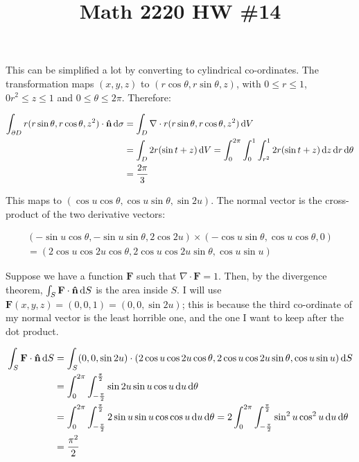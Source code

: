 

\title{Math 2220 HW \#14}
\author{\name}
\maketitle


This can be simplified a lot by converting to cylindrical co-ordinates. The transformation maps $(x, y, z)$ to $(r \cos\theta, r \sin\theta, z)$, with $0 \leq r \leq 1$, $0 r^2 \leq z \leq 1$ and $0 \leq \theta \leq 2\pi$. Therefore:

\begin{align*}
  \int_{\partial D} r(r \sin\theta, r \cos\theta, z^2) \cdot \mathbf{\hat{n}} \mathop{}\!\mathrm{d} \sigma &= \int_D \nabla \cdot r(r \sin\theta, r \cos\theta, z^2) \mathop{}\!\mathrm{d} V \\
  &= \int_D 2r(\sin t + z) \mathop{}\!\mathrm{d} V = \int_0^{2\pi} \int_0^1 \int_{r^2}^1 2r(\sin t + z) \mathop{}\!\mathrm{d} z \mathop{}\!\mathrm{d} r \mathop{}\!\mathrm{d} \theta \\
  &= \frac{2\pi}{3}
\end{align*}


This maps to $(\cos u \cos\theta, \cos u \sin\theta, \sin 2u)$. The normal vector is the cross-product of the two derivative vectors:

\begin{align*}
  (-\sin u \cos\theta, -\sin u \sin\theta, 2\cos 2u) \times (-\cos u \sin\theta, \cos u \cos\theta, 0) \\
  = (2\cos u \cos 2u \cos\theta, 2 \cos u \cos 2u \sin\theta, \cos u \sin u)
\end{align*}

Suppose we have a function $\mathbf{F}$ such that $\nabla \cdot \mathbf{F} = 1$. Then, by the divergence theorem, $\int_S \mathbf{F} \cdot \mathbf{\hat{n}} \mathop{}\!\mathrm{d} S$ is the area inside $S$. I will use $\mathbf{F}(x, y, z) = (0, 0, 1) = (0, 0, \sin 2u)$; this is because the third co-ordinate of my normal vector is the least horrible one, and the one I want to keep after the dot product.

\begin{align*}
  \int_S \mathbf{F} \cdot \mathbf{\hat{n}} \diff S &= \int_S (0, 0, \sin 2u) \cdot (2\cos u \cos 2u \cos\theta, 2 \cos u \cos 2u \sin\theta, \cos u \sin u) \diff S \\
  &= \int_0^{2\pi} \int_{-\frac{\pi}{2}}^{\frac{\pi}{2}} \sin 2u \sin u \cos u \diff u \diff \theta \\
  &= \int_0^{2\pi} \int_{-\frac{\pi}{2}}^{\frac{\pi}{2}} 2 \sin u \sin u \cos \cos u \diff u \diff \theta = 2 \int_0^{2\pi} \int_{-\frac{\pi}{2}}^{\frac{\pi}{2}} \sin^2 u \cos^2 u \diff u \diff \theta \\
  &= \frac{\pi^2}{2}
\end{align*}

